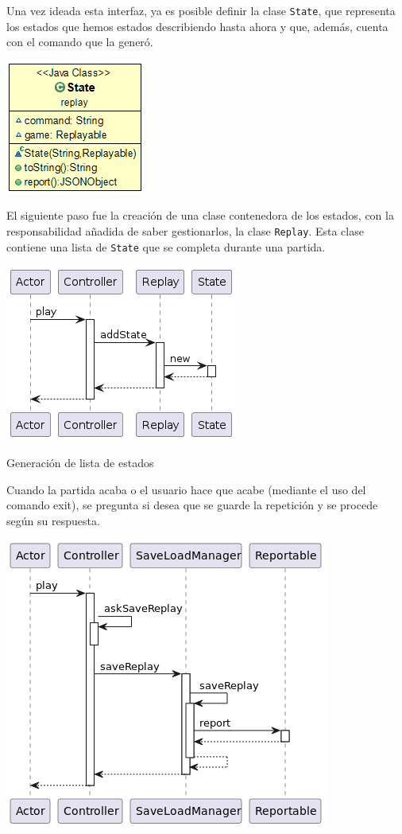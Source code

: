 \documentclass[../DocumentoOficial.tex]{subfiles}
\begin{document}
\begin{sprint}[3]
Una vez ideada esta interfaz, ya es posible definir la clase \texttt{State}, que representa los estados que hemos estados describiendo hasta ahora y que, además, cuenta con el comando que la generó.

\begin{center}
\includegraphics[scale=0.5]{state-sprint-3.png}
\end{center}

El siguiente paso fue la creación de una clase contenedora de los estados, con la responsabilidad añadida de saber gestionarlos, la clase \texttt{Replay}. Esta clase contiene una lista de \texttt{State} que se completa durante una partida.

\begin{center}
\includegraphics[scale=0.6]{addState-replay-sprint-3.png}

Generación de lista de estados
\end{center}

Cuando la partida acaba o el usuario hace que acabe (mediante el uso del comando exit), se pregunta si desea que se guarde la repetición y se procede según su respuesta.

\begin{center}
\includegraphics[scale=0.6]{saveReplay-sprint3.png}


\end{center}
\end{sprint}
\end{document}
